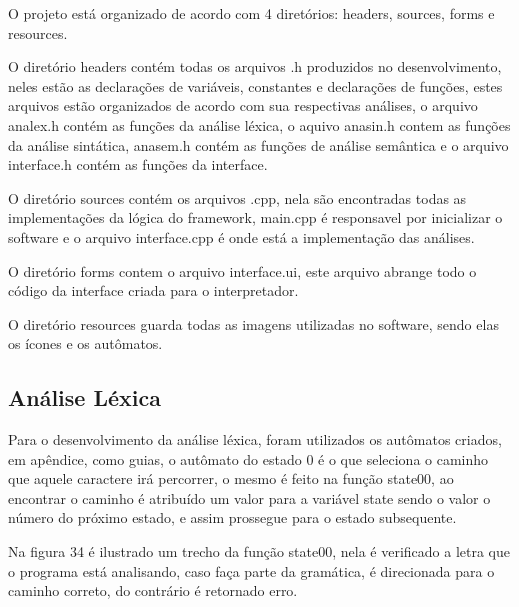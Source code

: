 \documentclass[12pt,oneside,a4paper,chapter=TITLE,section=TITLE,sumario=tradicional]{abntex2}
\begin{document}
\begin{figure}[htb]
\end{figure}

O projeto está organizado de acordo com 4 diretórios: headers, sources, forms e resources.

O diretório headers contém todas os arquivos .h produzidos no desenvolvimento, neles estão as declarações de variáveis, constantes e declarações de funções, estes arquivos estão organizados de acordo com sua respectivas análises, o arquivo analex.h contém as funções da análise léxica, o aquivo anasin.h contem as funções da análise sintática, anasem.h contém as funções de análise semântica e o arquivo interface.h contém as funções da interface.

O diretório sources contém os arquivos .cpp, nela são encontradas todas as implementações da lógica do framework, main.cpp é responsavel por inicializar o software e o arquivo interface.cpp é onde está a implementação das análises.

O diretório forms contem o arquivo interface.ui, este arquivo abrange todo o código da interface criada para o interpretador.

O diretório resources guarda todas as imagens utilizadas no software, sendo elas os ícones e os autômatos.

\subsection{Análise Léxica}
\label{subsec:analiselexica}

Para o desenvolvimento da análise léxica, foram utilizados os autômatos criados, em apêndice, como guias, o autômato do estado 0 é o que seleciona o caminho que aquele caractere irá percorrer, o mesmo é feito na função state00, ao encontrar o caminho é atribuído um valor para a variável state sendo o valor o número do próximo estado, e assim prossegue para o estado subsequente.

Na figura 34 é ilustrado um trecho da função state00, nela é verificado a letra que o programa está analisando, caso faça parte da gramática, é direcionada para o caminho correto, do contrário é retornado erro.

\begin{figure}[htb]
\end{figure} 
\end{document}
